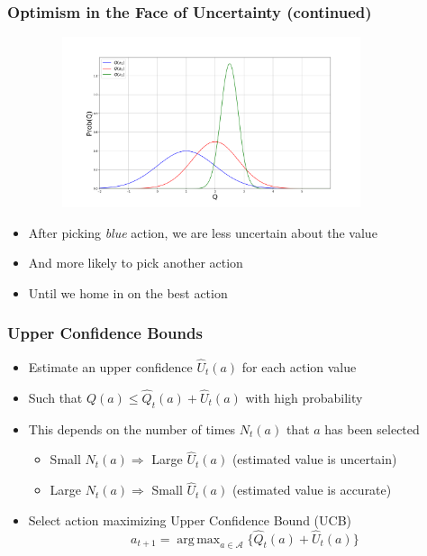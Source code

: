\documentclass[handout]{beamer}
\DeclareMathOperator*{\argmax}{arg\,max}
\begin{document}
\begin{frame}
\frametitle{Optimism in the Face of Uncertainty (continued)}
\pause
\includegraphics[width=12cm, height=5cm]{q_pdfs2.png}
\begin{itemize}[<+->]
\item After picking {\em blue} action, we are less uncertain about the value
\item And more likely to pick another action
 \item Until we home in on the best action
\end{itemize}
\end{frame}



\begin{frame}
\frametitle{Upper Confidence Bounds}
\pause
\begin{itemize}[<+->]
\item Estimate an upper confidence $\hat{U}_t(a)$ for each action value
\item Such that $Q(a) \leq \hat{Q}_t(a) + \hat{U}_t(a)$ with high probability
\item This depends on the number of times $N_t(a)$ that $a$ has been selected
\begin{itemize}
\item Small $N_t(a) \Rightarrow$ Large $\hat{U}_t(a)$ (estimated value is uncertain)
\item Large $N_t(a) \Rightarrow$ Small $\hat{U}_t(a)$ (estimated value is accurate)
\end{itemize}
\item Select action maximizing Upper Confidence  Bound (UCB)
$$a_{t+1} = \argmax_{a\in\mathcal{A}} \{ \hat{Q}_t(a) + \hat{U}_t(a) \}$$
\end{itemize}
\end{frame}
\end{document}
